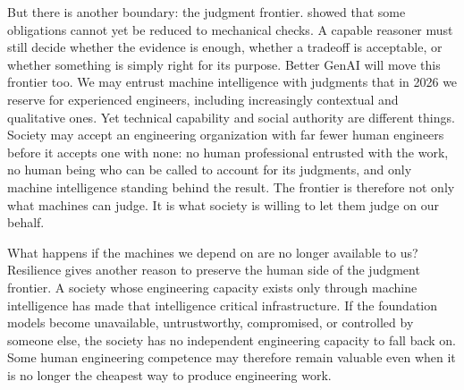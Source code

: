 
But there is another boundary: the judgment frontier.  showed that some obligations cannot yet be reduced to mechanical checks. A capable reasoner must still decide whether the evidence is enough, whether a tradeoff is acceptable, or whether something is simply right for its purpose. Better GenAI will move this frontier too. We may entrust machine intelligence with judgments that in 2026 we reserve for experienced engineers, including increasingly contextual and qualitative ones. Yet technical capability and social authority are different things. Society may accept an engineering organization with far fewer human engineers before it accepts one with none: no human professional entrusted with the work, no human being who can be called to account for its judgments, and only machine intelligence standing behind the result. The frontier is therefore not only what machines can judge. It is what society is willing to let them judge on our behalf.


What happens if the machines we depend on are no longer available to us? Resilience gives another reason to preserve the human side of the judgment frontier. A society whose engineering capacity exists only through machine intelligence has made that intelligence critical infrastructure. If the foundation models become unavailable, untrustworthy, compromised, or controlled by someone else, the society has no independent engineering capacity to fall back on. Some human engineering competence may therefore remain valuable even when it is no longer the cheapest way to produce engineering work.

